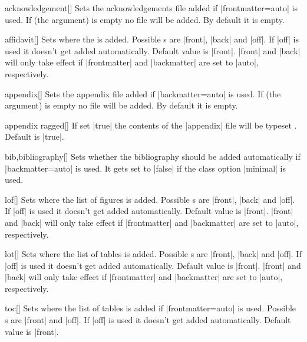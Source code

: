 \begin{describeopt}{acknowledgement}[]
  Sets the acknowledgements file added if \bverb|frontmatter=auto| is used. If
   (the argument) is empty no file will be added. By default it is
  empty.
\end{describeopt}
\begin{describeopt}{affidavit}[]
  Sets where the  is added. Possible s are |front|,
  |back| and |off|. If |off| is used it doesn't get added automatically. Default
  value is |front|. |front| and |back| will only take effect if |frontmatter|
  and |backmatter| are set to |auto|, respectively.
\end{describeopt}
\begin{describeopt}{appendix}[]
  Sets the appendix file added if \bverb|backmatter=auto| is used. If
   (the argument) is empty no file will be added. By default it is
  empty.
\end{describeopt}
\begin{describeopt}{appendix ragged}[]
  If set |true| the contents of the |appendix| file will be typeset
  . Default is |true|.
\end{describeopt}
\begin{describeopt}{bib,bibliography}[]
  Sets whether the bibliography should be added automatically if
  \bverb|backmatter=auto| is used. It gets set to |false| if the
  class option |minimal| is used. 
\end{describeopt}
\begin{describeopt}{lof}[]
  Sets where the list of figures is added. Possible s are |front|,
  |back| and |off|. If |off| is used it doesn't get added automatically. Default
  value is |front|. |front| and |back| will only take effect if |frontmatter|
  and |backmatter| are set to |auto|, respectively.
\end{describeopt}
\begin{describeopt}{lot}[]
  Sets where the list of tables is added. Possible s are |front|,
  |back| and |off|. If |off| is used it doesn't get added automatically. Default
  value is |front|. |front| and |back| will only take effect if |frontmatter|
  and |backmatter| are set to |auto|, respectively.
\end{describeopt}
\begin{describeopt}{toc}[]
  Sets where the list of tables is added if |frontmatter=auto| is used. Possible
  s are |front| and |off|. If |off| is used it doesn't get added
  automatically. Default value is |front|.
\end{describeopt}

